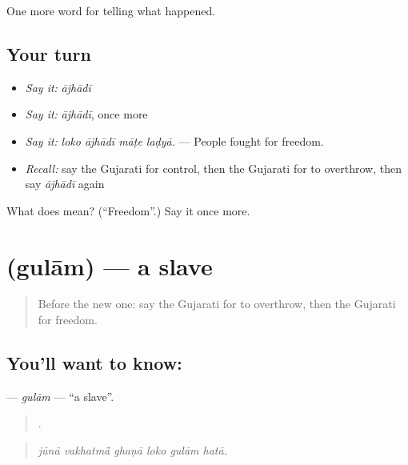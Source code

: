 \begin{grammarlens}[title={What you've built}]
One more word for telling what happened.
\end{grammarlens}

\subsection*{Your turn}
\begin{itemize}
\raggedright
  \item \emph{Say it:} \emph{ājhādī}
  \item \emph{Say it:} \emph{ājhādī}, once more
  \item \emph{Say it:} \emph{loko ājhādī māṭe laḍyā.} — People fought for freedom.
  \item \emph{Recall:} say the Gujarati for control, then the Gujarati for to overthrow, then say \emph{ājhādī} again
\end{itemize}

\begin{tcolorbox}[breakable,colback=teal!4,colframe=teal!35!black,title={Before you move on}]
What does  mean? (\textquotedblleft{}Freedom\textquotedblright{}.) Say it once more.
\end{tcolorbox}
\section[\texorpdfstring{\gu{ગુલામ} (gulām)}{ગુલામ (gulām)}]{ (gulām) — a slave}

\label{lesson:GU-C325-gulam}



\begin{quote}
Before the new one: say the Gujarati for to overthrow, then the Gujarati for freedom.
\end{quote}

\subsection*{You'll want to know: }
\textbf{} — \emph{gulām} — \textquotedblleft{}a slave\textquotedblright{}.

\begin{quote}
     .
\end{quote}

\begin{quote}
\emph{jūnā vakhatmā̃ ghaṇā loko gulām hatā.}
\end{quote}

